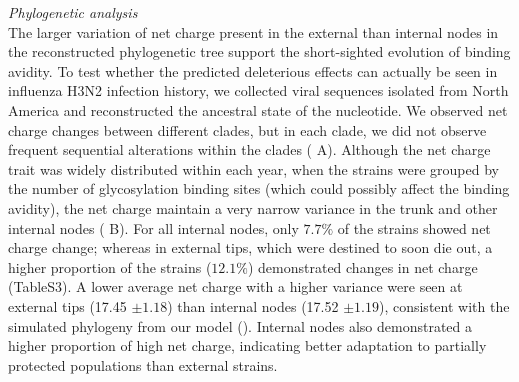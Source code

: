 \documentclass[12pt,a4paper]{article}
\begin{document}
{\it  Phylogenetic analysis} \\
The larger variation of net charge present in the external than internal nodes in the reconstructed phylogenetic tree support the short-sighted evolution of binding avidity. To test whether the predicted deleterious effects can actually be seen in influenza H3N2 infection history, we collected viral sequences isolated from North America and reconstructed the ancestral state of the nucleotide. We observed net charge changes between different clades, but in each clade, we did not observe frequent sequential alterations within the clades ( A). Although the net charge trait was widely distributed within each year, when the strains were grouped by the number of glycosylation binding sites (which could possibly affect the binding avidity), the net charge maintain a very narrow variance in the trunk and other internal nodes ( B). For all internal nodes, only $7.7\%$ of the strains showed net charge change; whereas in external tips, which were destined to soon die out, a higher proportion of the strains ($12.1\%$) demonstrated changes in net charge (TableS3). A lower average net charge with a higher variance were seen at external tips (17.45 $ \pm1.18$) than internal nodes (17.52 $ \pm1.19$), consistent with the simulated phylogeny from our model (). Internal nodes also demonstrated a higher proportion of high net charge, indicating better adaptation to partially protected populations than external strains. \\

\clearpage
\end{document}
